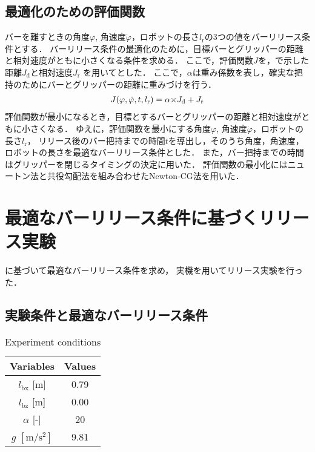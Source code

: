         \subsection{最適化のための評価関数}
        
        バーを離すときの角度$\varphi$, 角速度$\dot{\varphi}$，ロボットの長さ$l_{\mathrm{r}}$の3つの値をバーリリース条件とする．
        バーリリース条件の最適化のために，目標バーとグリッパーの距離と相対速度がともに小さくなる条件を求める．
        ここで，評価関数$J$を，で示した距離$J_{\mathrm{d}}$と相対速度$J_{\mathrm{r}}$
        を用いてとした．
        ここで，$\alpha$は重み係数を表し，確実な把持のためにバーとグリッパーの距離に重みづけを行う．
        \begin{eqnarray}
          \equlabel{J}
          J(\varphi,\dot{\varphi},t,l_{\mathrm{r}})=\alpha{\times}J_{\mathrm{d}}+J_{\mathrm{r}}
        \end{eqnarray}
        評価関数が最小になるとき，目標とするバーとグリッパーの距離と相対速度がともに小さくなる．
        ゆえに，評価関数を最小にする角度$\varphi$, 角速度$\dot{\varphi}$，ロボットの長さ$l_{\mathrm{r}}$，
        リリース後のバー把持までの時間$t$を導出し，そのうち角度，角速度，ロボットの長さを最適なバーリリース条件とした．
        また，バー把持までの時間はグリッパーを閉じるタイミングの決定に用いた．
        評価関数の最小化にはニュートン法と共役勾配法を組み合わせたNewton-CG法を用いた．

      \section{最適なバーリリース条件に基づくリリース実験}
      
      に基づいて最適なバーリリース条件を求め，
      実機を用いてリリース実験を行った．  
      
        \subsection{実験条件と最適なバーリリース条件}
        \begin{table}[tb]
          
          \begin{center}
            \caption{Experiment conditions}
            \vspace{2mm}
            \begin{tabular}{c|c}
              \hline
              Variables & Values \\
              \hline
              $l_{\mathrm{bx}}$ [m] & 0.79 \\
              $l_{\mathrm{bz}}$ [m] & 0.00 \\
              $\alpha$ [-]& 20 \\
              $g$ $\mathrm{[m/s^2]}$ & 9.81 \\
              \hline
            \end{tabular}
          \end{center}
        \end{table}
  
